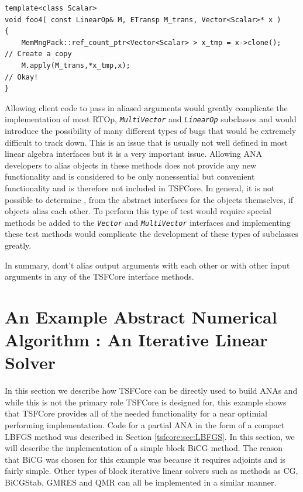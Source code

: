 \documentclass[10pt,fleqn]{article}
\begin{document}
{\scriptsize\begin{verbatim}
template<class Scalar>
void foo4( const LinearOp& M, ETransp M_trans, Vector<Scalar>* x )
{
    MemMngPack::ref_count_ptr<Vector<Scalar> > x_tmp = x->clone();   // Create a copy
    M.apply(M_trans,*x_tmp,x);                                       // Okay!
}
\end{verbatim}}

Allowing client code to pass in aliased arguments would greatly
complicate the implementation of most RTOp,
\texttt{\textit{MultiVector}} and \texttt{\textit{LinearOp}}
subclasses and would introduce the possibility of many different types
of bugs that would be extremely difficult to track down.  This is an
issue that is usually not well defined in most linear algebra
interfaces but it is a very important issue.  Allowing ANA developers
to alias objects in these methods does not provide any new
functionality and is considered to be only nonessential but convenient
functionality and is therefore not included in TSFCore.  In general,
it is not possible to determine , from the abstract interfaces for the
objects themselves, if objects alias each other.  To perform this type
of test would require special methods be added to the
\texttt{\textit{Vector}} and
\texttt{\textit{MultiVector}} interfaces and implementing these test
methods would complicate the development of these types of subclasses
greatly.

In summary, dont't alias output arguments with each other or with
other input arguments in any of the TSFCore interface methods.

%
\section{An Example Abstract Numerical Algorithm : An Iterative Linear Solver}
\label{tsfcore:sec:ANA_iter_solver_example}
%

In this section we describe how TSFCore can be directly used to build
ANAs and while this is not the primary role TSFCore is designed for, this
example shows that TSFCore provides all of the needed functionality for a
near optimial performing implementation.  Code for a partial ANA in
the form of a compact LBFGS method was described in Section
\ref{tsfcore:sec:LBFGS}.  In this section, we will describe the
implementation of a simple block BiCG
\cite{ref:tmpls_for_iter_systems} method.  The reason that BiCG was
chosen for this example was because it requires adjoints and is fairly
simple.  Other types of block iterative linear solvers such as methods
as CG, BiCGStab, GMRES and QMR \cite{ref:tmpls_for_iter_systems} can
all be implemented in a similar manner.
\end{document}
